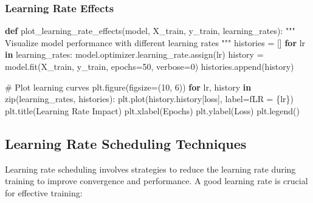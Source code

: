 \documentclass[
  letterpaper,
  DIV=11,
  numbers=noendperiod]{scrreprt}
\newenvironment{Shaded}{\begin{snugshade}}{\end{snugshade}}
\newcommand{\BuiltInTok}[1]{\textcolor[rgb]{0.00,0.23,0.31}{#1}}
\newcommand{\CommentTok}[1]{\textcolor[rgb]{0.37,0.37,0.37}{#1}}
\newcommand{\ControlFlowTok}[1]{\textcolor[rgb]{0.00,0.23,0.31}{\textbf{#1}}}
\newcommand{\DecValTok}[1]{\textcolor[rgb]{0.68,0.00,0.00}{#1}}
\newcommand{\KeywordTok}[1]{\textcolor[rgb]{0.00,0.23,0.31}{\textbf{#1}}}
\newcommand{\NormalTok}[1]{\textcolor[rgb]{0.00,0.23,0.31}{#1}}
\newcommand{\OperatorTok}[1]{\textcolor[rgb]{0.37,0.37,0.37}{#1}}
\newcommand{\SpecialCharTok}[1]{\textcolor[rgb]{0.37,0.37,0.37}{#1}}
\newcommand{\SpecialStringTok}[1]{\textcolor[rgb]{0.13,0.47,0.30}{#1}}
\newcommand{\StringTok}[1]{\textcolor[rgb]{0.13,0.47,0.30}{#1}}
\begin{document}
\subsubsection{Learning Rate Effects}\label{learning-rate-effects}

\begin{Shaded}
\begin{Highlighting}[]
\KeywordTok{def}\NormalTok{ plot\_learning\_rate\_effects(model, X\_train, y\_train, learning\_rates):}
    \CommentTok{"""}
\CommentTok{    Visualize model performance with different learning rates}
\CommentTok{    """}
\NormalTok{    histories }\OperatorTok{=}\NormalTok{ []}
    \ControlFlowTok{for}\NormalTok{ lr }\KeywordTok{in}\NormalTok{ learning\_rates:}
\NormalTok{        model.optimizer.learning\_rate.assign(lr)}
\NormalTok{        history }\OperatorTok{=}\NormalTok{ model.fit(X\_train, y\_train, epochs}\OperatorTok{=}\DecValTok{50}\NormalTok{, verbose}\OperatorTok{=}\DecValTok{0}\NormalTok{)}
\NormalTok{        histories.append(history)}
    
    \CommentTok{\# Plot learning curves}
\NormalTok{    plt.figure(figsize}\OperatorTok{=}\NormalTok{(}\DecValTok{10}\NormalTok{, }\DecValTok{6}\NormalTok{))}
    \ControlFlowTok{for}\NormalTok{ lr, history }\KeywordTok{in} \BuiltInTok{zip}\NormalTok{(learning\_rates, histories):}
\NormalTok{        plt.plot(history.history[}\StringTok{\textquotesingle{}loss\textquotesingle{}}\NormalTok{], label}\OperatorTok{=}\SpecialStringTok{f\textquotesingle{}LR = }\SpecialCharTok{\{}\NormalTok{lr}\SpecialCharTok{\}}\SpecialStringTok{\textquotesingle{}}\NormalTok{)}
\NormalTok{    plt.title(}\StringTok{\textquotesingle{}Learning Rate Impact\textquotesingle{}}\NormalTok{)}
\NormalTok{    plt.xlabel(}\StringTok{\textquotesingle{}Epochs\textquotesingle{}}\NormalTok{)}
\NormalTok{    plt.ylabel(}\StringTok{\textquotesingle{}Loss\textquotesingle{}}\NormalTok{)}
\NormalTok{    plt.legend()}
\end{Highlighting}
\end{Shaded}

\subsection{Learning Rate Scheduling
Techniques}\label{learning-rate-scheduling-techniques}

Learning rate scheduling involves strategies to reduce the learning rate
during training to improve convergence and performance. A good learning
rate is crucial for effective training:
\end{document}

